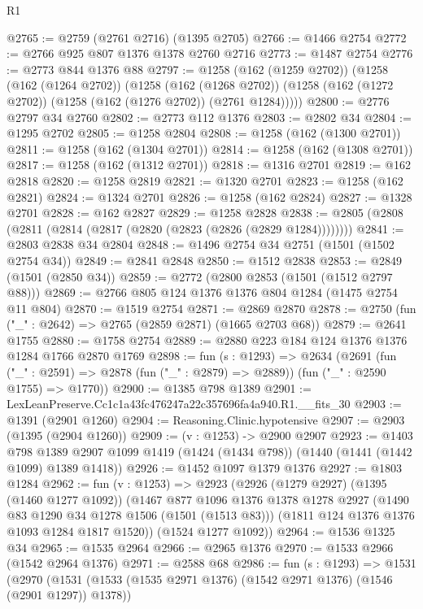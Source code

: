 \begin{lexlean}{R1}
\begin{coremodule}
@2765 := @2759 (@2761 @2716) (@1395 @2705)
@2766 := @1466 @2754
@2772 := @2766 @925 @807 @1376 @1378 @2760 @2716
@2773 := @1487 @2754
@2776 := @2773 @844 @1376 @88
@2797 := @1258
    (@162 (@1259 @2702))
    (@1258
      (@162 (@1264 @2702))
      (@1258
        (@162 (@1268 @2702))
        (@1258 (@162 (@1272 @2702)) (@1258 (@162 (@1276 @2702)) (@2761 @1284)))))
@2800 := @2776 @2797 @34 @2760
@2802 := @2773 @112 @1376
@2803 := @2802 @34
@2804 := @1295 @2702
@2805 := @1258 @2804
@2808 := @1258 (@162 (@1300 @2701))
@2811 := @1258 (@162 (@1304 @2701))
@2814 := @1258 (@162 (@1308 @2701))
@2817 := @1258 (@162 (@1312 @2701))
@2818 := @1316 @2701
@2819 := @162 @2818
@2820 := @1258 @2819
@2821 := @1320 @2701
@2823 := @1258 (@162 @2821)
@2824 := @1324 @2701
@2826 := @1258 (@162 @2824)
@2827 := @1328 @2701
@2828 := @162 @2827
@2829 := @1258 @2828
@2838 := @2805 (@2808 (@2811 (@2814 (@2817 (@2820 (@2823 (@2826 (@2829 @1284))))))))
@2841 := @2803 @2838 @34 @2804
@2848 := @1496 @2754 @34 @2751 (@1501 (@1502 @2754 @34))
@2849 := @2841 @2848
@2850 := @1512 @2838
@2853 := @2849 (@1501 (@2850 @34))
@2859 := @2772 (@2800 @2853 (@1501 (@1512 @2797 @88)))
@2869 := @2766 @805 @124 @1376 @1376 @804 @1284 (@1475 @2754 @11 @804)
@2870 := @1519 @2754
@2871 := @2869 @2870
@2878 := @2750 (fun ("_" : @2642) => @2765 (@2859 @2871) (@1665 @2703 @68))
@2879 := @2641 @1755
@2880 := @1758 @2754
@2889 := @2880 @223 @184 @124 @1376 @1376 @1284 @1766 @2870 @1769
@2898 := fun (s : @1293) =>
  @2634
    (@2691
      (fun ("_" : @2591) => @2878 (fun ("_" : @2879) => @2889))
      (fun ("_" : @2590 @1755) => @1770))
@2900 := @1385 @798 @1389
@2901 := LexLeanPreserve.Cc1c1a43fc476247a22c357696fa4a940.R1.__fits_30
@2903 := @1391 (@2901 @1260)
@2904 := Reasoning.Clinic.hypotensive
@2907 := @2903 (@1395 (@2904 @1260))
@2909 := (v : @1253) -> @2900 @2907
@2923 := @1403
    @798
    @1389
    @2907
    @1099
    @1419
    (@1424 (@1434 @798))
    (@1440 (@1441 (@1442 @1099) @1389 @1418))
@2926 := @1452 @1097 @1379 @1376
@2927 := @1803 @1284
@2962 := fun (v : @1253) =>
  @2923
    (@2926
      (@1279 @2927)
      (@1395 (@1460 @1277 @1092))
      (@1467
        @877
        @1096
        @1376
        @1378
        @1278
        @2927
        (@1490 @83 @1290 @34 @1278 @1506 (@1501 (@1513 @83)))
        (@1811 @124 @1376 @1376 @1093 @1284 @1817 @1520))
      (@1524 @1277 @1092))
@2964 := @1536 @1325 @34
@2965 := @1535 @2964
@2966 := @2965 @1376
@2970 := @1533 @2966 (@1542 @2964 @1376)
@2971 := @2588 @68
@2986 := fun (s : @1293) =>
  @1531
    (@2970
      (@1531 (@1533 (@1535 @2971 @1376) (@1542 @2971 @1376) (@1546 (@2901 @1297)) @1378))

\end{coremodule}
\end{lexlean}
